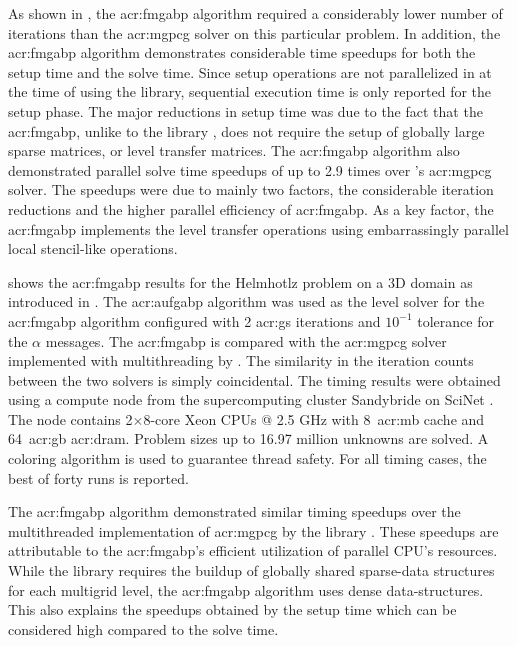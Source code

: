 As shown in , the \gls{acr:fmgabp} algorithm required a considerably lower number of iterations than the \gls{acr:mgpcg} solver on this particular problem.
In addition, the \gls{acr:fmgabp} algorithm demonstrates considerable time speedups for both the setup time and the solve time.
Since setup operations are not parallelized in  at the time of using the library, sequential execution time is only reported for the setup phase.
The major reductions in setup time was due to the fact that the \gls{acr:fmgabp}, unlike to the library , does not require the setup of globally large sparse matrices, or level transfer matrices.
The \gls{acr:fmgabp} algorithm also demonstrated parallel solve time speedups of up to 2.9 times over 's \gls{acr:mgpcg} solver.
The speedups were due to mainly two factors, the considerable iteration reductions and the higher parallel efficiency of \gls{acr:fmgabp}.
As a key factor, the \gls{acr:fmgabp} implements the level transfer operations using embarrassingly parallel local stencil-like operations.


 shows the \gls{acr:fmgabp} results for the Helmhotlz problem on a 3D domain as introduced in .
The \gls{acr:aufgabp} algorithm was used as the level solver for the \gls{acr:fmgabp} algorithm configured with 2 \gls{acr:gs} iterations and $10^{-1}$ tolerance for the $\alpha$ messages.
The \gls{acr:fmgabp} is compared with the \gls{acr:mgpcg} solver implemented with multithreading by .
The similarity in the iteration counts between the two solvers is simply coincidental.
The timing results were obtained using a compute node from the supercomputing cluster Sandybride on SciNet \cite{bib:scinet}.
The node contains 2$\times$8-core Xeon CPUs @ 2.5 GHz with 8~\gls{acr:mb} cache and 64~\gls{acr:gb} \gls{acr:dram}.
Problem sizes up to 16.97 million unknowns are solved.
A coloring algorithm is used to guarantee thread safety.
For all timing cases, the best of forty runs is reported.

The \gls{acr:fmgabp} algorithm demonstrated similar timing speedups over the multithreaded implementation of \gls{acr:mgpcg} by the library . 
These speedups are attributable to the \gls{acr:fmgabp}'s efficient utilization of parallel CPU's resources.
While the library  requires the buildup of globally shared sparse-data structures for each multigrid level, the \gls{acr:fmgabp} algorithm uses dense data-structures.
This also explains the speedups obtained by the setup time which can be considered high compared to the solve time.


